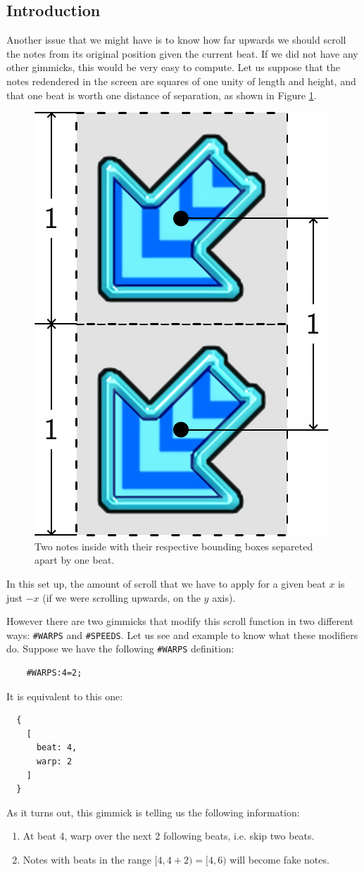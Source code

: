 \documentclass[a4paper,9pt]{article}
\begin{document}
    \subsection{Introduction}
    Another issue that we might have is to know how far upwards we should scroll the notes from its original position given the current beat. If we did not have any other gimmicks, this would be very easy to compute. Let us suppose that the notes redendered in the screen are squares of one unity of length and height, and that one beat is worth one distance of separation, as shown in Figure \ref{fig:notes-layout}.
    \begin{figure}[htpb]
	    \centering
	    \includegraphics[width=0.3\linewidth]{beat2scroll}
	    \caption{Two notes inside with their respective bounding boxes separeted apart by one beat.}
	    \label{fig:notes-layout}
    \end{figure}
    In this set up, the amount of scroll that we have to apply for a given beat $ x $ is just $ -x $ (if we were scrolling upwards, on the $y$ axis).

	    However there are two gimmicks that modify this scroll function in two different ways: \texttt{\#WARPS} and \texttt{\#SPEEDS}. Let us see and example to know what these modifiers do. Suppose we have the following \texttt{\#WARPS} definition:
    \begin{verbatim}
    #WARPS:4=2;     
    \end{verbatim}
    It is equivalent to this one:
    \begin{verbatim}
  {
    [
      beat: 4,
      warp: 2
    ]
  }
    \end{verbatim}
    As it turns out, this gimmick is telling us the following information:
    \begin{enumerate}
	    \item At beat 4, warp over the next 2 following beats, i.e. skip two beats.
	    \item Notes with beats in the range $ [4, 4+2) = [4,6) $ will become fake notes.
    \end{enumerate}
    
\end{document}

